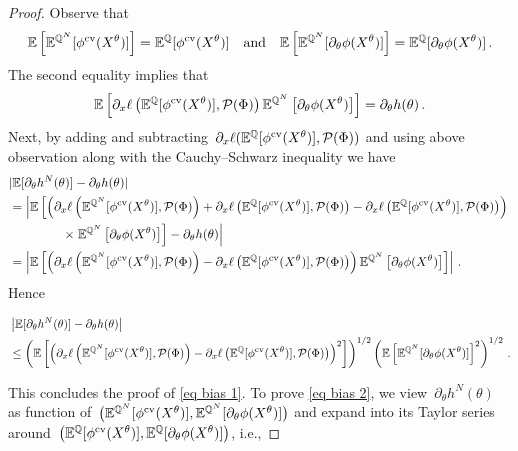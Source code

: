 \begin{proof}
Observe that
\[
\mathbb{E} \left[\mathbb{E}^{\mathbb{Q}^N}[\phi^{\textup{cv}}(X^{\theta})]\right] = \mathbb{E}^{\mathbb{Q}}[\phi^{\textup{cv}}(X^{\theta})] \quad \text{and} \quad \mathbb{E} \left[ \mathbb{E}^{\mathbb{Q}^N}[\partial_\theta \phi(X^{\theta})] \right] =\mathbb{E}^{\mathbb{Q}}[\partial_\theta \phi(X^{\theta})]\,.
\]  
The second equality implies that
\[
 \mathbb{E}\left[ \partial_x \ell\left(\mathbb{E}^{\mathbb{Q}}[\phi^{\textup{cv}}(X^{\theta})],\mathcal{P}(\Phi) \right) \mathbb{E}^{\mathbb{Q}^N}\left[\partial_\theta \phi(X^{\theta})\right] \right] =
  \partial_{\theta}h(\theta)\,.
\]
Next, by adding and subtracting~$\partial_x \ell(\mathbb{E}^{\mathbb{Q}}[\phi^{\textup{cv}}(X^{\theta})],\mathcal{P}(\Phi) )$ and using above observation along with the Cauchy--Schwarz inequality we have
\[
\begin{split}
& | \mathbb{E}[\partial_{\theta}h^{N}(\theta) ] - \partial_{\theta}h(\theta) |\\
	& =  \left| \mathbb{E}\left[\left(\partial_x \ell\left(\mathbb{E}^{\mathbb{Q}^N}[\phi^{\textup{cv}}(X^{\theta})],\mathcal{P}(\Phi) \right) + \partial_x \ell\left(\mathbb{E}^{\mathbb{Q}}[\phi^{\textup{cv}}(X^{\theta})],\mathcal{P}(\Phi) \right) -\partial_x \ell\left(\mathbb{E}^{\mathbb{Q}}[\phi^{\textup{cv}}(X^{\theta})],\mathcal{P}(\Phi) \right) \right) \right.\right. \\ & \qquad \qquad \left.\left. \times \; \mathbb{E}^{\mathbb{Q}^N}\left[\partial_\theta \phi(X^{\theta})\right]\right]
 - \partial_{\theta}h(\theta) \right|\, \\
& = \left|\mathbb{E}\left[\left(\partial_x \ell\left(\mathbb{E}^{\mathbb{Q}^N}[\phi^{\textup{cv}}(X^{\theta})],\mathcal{P}(\Phi) \right)- \partial_x \ell\left(\mathbb{E}^{\mathbb{Q}}[\phi^{\textup{cv}}(X^{\theta})],\mathcal{P}(\Phi) \right) \right)\mathbb{E}^{\mathbb{Q}^N}\left[\partial_\theta \phi(X^{\theta})\right] \right]  \right| \,.
 \end{split}
\]
Hence
\begin{small}
\begin{equation*}
\begin{split}
& \left\lvert \mathbb{E}[\partial_{\theta}h^{N}(\theta) ] - \partial_{\theta}h(\theta) \right\rvert\\
 & \leq \left( \mathbb{E}\left[ \left(\partial_x \ell\left(\mathbb{E}^{\mathbb{Q}^N}[\phi^{\textup{cv}}(X^{\theta})],\mathcal{P}(\Phi) \right)- \partial_x \ell\left(\mathbb{E}^{\mathbb{Q}}[\phi^{\textup{cv}}(X^{\theta})],\mathcal{P}(\Phi) \right) \right)^2 \right] \right)^{1/2} \left( \mathbb{E} \left[\mathbb{E}^{\mathbb{Q}^N}[\partial_\theta \phi(X^{\theta})]\right]^2 \right)^{1/2}\,.
 \end{split}
\end{equation*}
\end{small}%
This concludes the proof of \eqref{eq bias 1}. To prove \eqref{eq bias 2}, we view~$\partial_{\theta}h^{N}(\theta)$ as function of~$\big(\mathbb{E}^{\mathbb{Q}^N}[\phi^{\textup{cv}}(X^{\theta})], \allowbreak \mathbb{E}^{\mathbb{Q}^N}[\partial_\theta \phi(X^{\theta})]\big)$ and expand into its Taylor series around~$\big(\mathbb{E}^{\mathbb{Q}}[\phi^{\textup{cv}}(X^{\theta})], \mathbb{E}^{\mathbb{Q}}[\partial_\theta \phi(X^{\theta})]\big)$, i.e.,

\end{proof}
